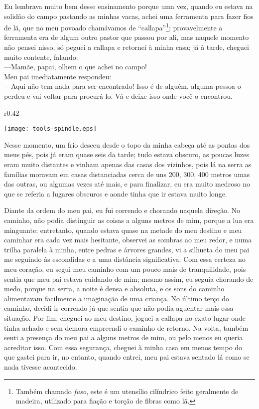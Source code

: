Eu lembrava muito bem desse ensinamento porque uma vez, quando eu estava na solidão do campo pastando as minhas vacas, achei uma ferramenta para fazer fios de lã, que no meu povoado chamávamos de ``callapa''\footnote{Também chamado \textit{fuso}, este é um utensílio cilíndrico feito geralmente de madeira, utilizado para fiação e torção de fibras como lã.}; provavelmente a ferramenta era de algum outro pastor que passou por ali, mas naquele momento não pensei nisso, só peguei a callapa e retornei à minha casa; já à tarde, cheguei  muito contente, falando:\\\indent
---Mamãe, papai, olhem o que achei no campo!\\\indent
Meu pai imediatamente respondeu:\\\indent
---Aqui não tem nada para ser encontrado! Isso é de alguém, alguma pessoa o perdeu e vai voltar para procurá-lo. 
Vá e deixe isso onde você o encontrou.

\ifdefined\EnableIncludeImages
\begin{wrapfigure}{r}{0.42\textwidth}
  \begin{center}
  \vspace{-10pt}
    \texttt{[image: tools-spindle.eps]}
  \end{center}
  \vspace{-20pt}
\end{wrapfigure}
\fi
Nesse momento, um frio desceu desde o topo da minha cabeça até as pontas dos meus pés, pois já eram quase seis da tarde; tudo estava obscuro, as poucas luzes eram muito distantes e vinham apenas das casas dos vizinhos, pois lá na serra as famílias moravam em casas distanciadas cerca de uns 200, 300, 400 metros umas das outras, ou algumas vezes até mais, e para finalizar, eu era muito medroso no que se referia a lugares obscuros e aonde tinha que ir estava muito longe.

Diante da ordem do meu pai, eu fui correndo e chorando naquela direção. No caminho, não podia distinguir as coisas a alguns metros de mim, porque a lua era minguante; entretanto, quando estava quase na metade do meu destino e meu caminhar era cada vez mais hesitante, observei as sombras ao meu redor, e numa trilha paralela à minha, entre pedras e árvores grandes, vi a silhueta do meu pai me seguindo às escondidas e a uma distância significativa.
Com essa certeza no meu coração, eu segui meu caminho com um pouco mais de tranquilidade, pois sentia que meu pai estava cuidando de mim; mesmo assim, eu seguia chorando de medo, porque na serra, a noite é densa e absoluta, e os sons do caminho alimentavam facilmente a imaginação de uma criança.
No último terço do caminho, decidi ir correndo já que sentia que não podia aguentar mais essa situação. Por fim, cheguei ao meu destino, joguei a callapa no exato lugar onde tinha achado e sem demora empreendi o caminho de retorno.
Na volta, também senti a presença do meu pai a alguns metros de mim, ou pelo menos eu queria acreditar isso. Com essa segurança, cheguei à minha casa em menos tempo do que gastei para ir, no entanto, quando entrei, meu pai estava sentado lá como se nada tivesse acontecido.


